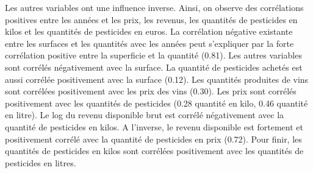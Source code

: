\documentclass[11pt, a4paper]{article}
\begin{document}
Les autres variables ont une influence inverse. 
Ainsi, on observe des corrélations positives entre les années et les prix, les revenus, les quantités de pesticides en kilos et les quantités de pesticides en euros. 
La corrélation négative existante entre les surfaces et les quantités avec les années peut s’expliquer par la forte corrélation positive entre la superficie et la quantité (0.81). 
Les autres variables sont corrélés négativement avec la surface. 
La quantité de pesticides achetés est aussi corrélée positivement avec la surface (0.12). 
Les quantités produites de vins sont corrélées positivement avec les prix des vins (0.30). 
Les prix sont corrélés positivement avec les quantités de pesticides (0.28 quantité en kilo, 0.46 quantité en litre). 
Le log du revenu disponible brut est corrélé négativement avec la quantité de pesticides en kilos. 
A l’inverse, le revenu disponible est fortement et positivement corrélé avec la quantité de pesticides en prix (0.72). 
Pour finir, les quantités de pesticides en kilos sont corrélées positivement avec les quantités de pesticides en litres. 
\newpage
\end{document}

